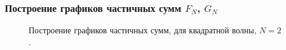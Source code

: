 \documentclass[a5paper, 10pt]{article}
\theoremstyle{definition}
\theoremstyle{plain}
\theoremstyle{remark}
\begin{document}
\subsubsection{Построение графиков частичных сумм $F_N$, $G_N$}

\begin{figure}[h]
\begin{minipage}[h]{0.5\linewidth}
\end{minipage}
\hfill
\begin{minipage}[h]{0.5\linewidth}
\end{minipage}
\caption{Построение графиков частичных сумм, для квадратной волны, $N=2$.}
\end{figure}
\end{document}

